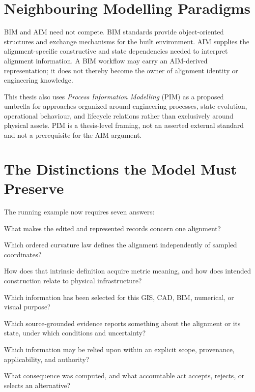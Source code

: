 \section{Neighbouring Modelling Paradigms}

BIM and AIM need not compete. BIM standards provide object-oriented structures
and exchange mechanisms for the built environment. AIM supplies the
alignment-specific constructive and state dependencies needed to interpret
alignment information. A BIM workflow may carry an AIM-derived representation;
it does not thereby become the owner of alignment identity or engineering
knowledge.

This thesis also uses \emph{Process Information Modelling} (PIM) as a proposed
umbrella for approaches organized around engineering processes, state evolution,
operational behaviour, and lifecycle relations rather than exclusively around
physical assets. PIM is a thesis-level framing, not an asserted external
standard and not a prerequisite for the AIM argument.

\section{The Distinctions the Model Must Preserve}

The running example now requires seven answers:

\begin{description}[style=nextline]
\item[Object identity]
What makes the edited and represented records concern one alignment?
\item[Constructive definition]
Which ordered curvature law defines the alignment independently of sampled
coordinates?
\item[Realization]
How does that intrinsic definition acquire metric meaning, and how does intended
construction relate to physical infrastructure?
\item[Representation]
Which information has been selected for this GIS, CAD, BIM, numerical, or visual
purpose?
\item[Observation]
Which source-grounded evidence reports something about the alignment or its
state, under which conditions and uncertainty?
\item[Knowledge]
Which information may be relied upon within an explicit scope, provenance,
applicability, and authority?
\item[Evaluation and decision]
What consequence was computed, and what accountable act accepts, rejects, or
selects an alternative?
\end{description}

